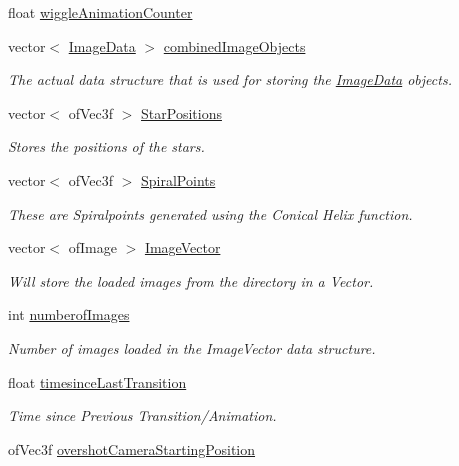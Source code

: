 \begin{DoxyCompactItemize}
\item 
float \hyperlink{classtest_app_a6073b33be7847d675ec089a1d514c506}{wiggle\-Animation\-Counter}
\item 
vector$<$ \hyperlink{struct_image_data}{Image\-Data} $>$ \hyperlink{classtest_app_aced9b8a8419c8465877c2c9cd43f8934}{combined\-Image\-Objects}
\begin{DoxyCompactList}\small\item\em The actual data structure that is used for storing the \hyperlink{struct_image_data}{Image\-Data} objects. \end{DoxyCompactList}\item 
vector$<$ of\-Vec3f $>$ \hyperlink{classtest_app_a68d0d30cea64a9d39a1b2deef16677ad}{Star\-Positions}
\begin{DoxyCompactList}\small\item\em Stores the positions of the stars. \end{DoxyCompactList}\item 
vector$<$ of\-Vec3f $>$ \hyperlink{classtest_app_af0dd2f3e3aabdb43bee49d74c156dc05}{Spiral\-Points}
\begin{DoxyCompactList}\small\item\em These are Spiralpoints generated using the Conical Helix function. \end{DoxyCompactList}\item 
vector$<$ of\-Image $>$ \hyperlink{classtest_app_ad4de5d6e6e8f3b8bb7424e62792deb1f}{Image\-Vector}
\begin{DoxyCompactList}\small\item\em Will store the loaded images from the directory in a Vector. \end{DoxyCompactList}\item 
int \hyperlink{classtest_app_a957cf7fdb3ea964a88ca1be13e4d68fc}{numberof\-Images}
\begin{DoxyCompactList}\small\item\em Number of images loaded in the Image\-Vector data structure. \end{DoxyCompactList}\item 
float \hyperlink{classtest_app_acb60fb8a89e9ec5d461630a20b11ceda}{timesince\-Last\-Transition}
\begin{DoxyCompactList}\small\item\em Time since Previous Transition/\-Animation. \end{DoxyCompactList}\item 
of\-Vec3f \hyperlink{classtest_app_a846feea7c2c4d4b1929bb72c546b3e19}{overshot\-Camera\-Starting\-Position}

\end{DoxyCompactItemize}
